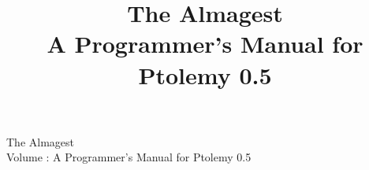

\begin{iftex}
\begin{titlepage}
\centering
\Huge\bsf
The Almagest \\
\comment {}
Volume \thevolume :  A Programmer's Manual for Ptolemy 0.5
\end{titlepage}

\clearpage
\pagestyle{empty}
\vspace*{\fill}


\clearpage
\pagestyle{headings}
\tableofcontents
\listoffigures
\listoftables

\clearpage
\end{iftex}

\begin{ifhtml}
\title{The Almagest\\
A Programmer's Manual for Ptolemy 0.5}
\author{}
\maketitle
\end{ifhtml}

